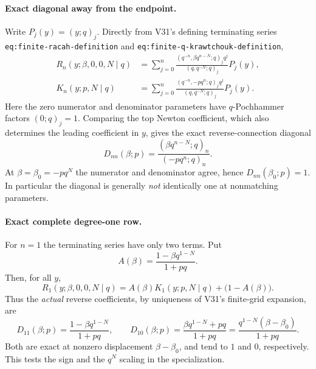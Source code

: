 \documentclass[11pt]{article}
\begin{document}
\paragraph{Exact diagonal away from the endpoint.} Write $P_j(y)=(y;q)_j$. Directly from V31's defining terminating series \texttt{eq:finite-racah-definition} and \texttt{eq:finite-q-krawtchouk-definition},
\begin{align*}
 R_n(y;\beta,0,0,N\mid q)
 &=\sum_{j=0}^n\frac{(q^{-n},\beta q^{n-N};q)_j q^j}{(q,q^{-N};q)_j}P_j(y),\\
 K_n(y;p,N\mid q)
 &=\sum_{j=0}^n\frac{(q^{-n},-pq^n;q)_j q^j}{(q,q^{-N};q)_j}P_j(y).
\end{align*}
Here the zero numerator and denominator parameters have $q$-Pochhammer factors $(0;q)_j=1$. Comparing the top Newton coefficient, which also determines the leading coefficient in $y$, gives the exact reverse-connection diagonal
\begin{equation}\label{eq:v122-diagonal}
 \boxed{D_{nn}(\beta;p)=\frac{(\beta q^{n-N};q)_n}{(-pq^n;q)_n}.}
\end{equation}
At $\beta=\beta_0=-pq^N$ the numerator and denominator agree, hence $D_{nn}(\beta_0;p)=1$. In particular the diagonal is generally \emph{not} identically one at nonmatching parameters.

\paragraph{Exact complete degree-one row.} For $n=1$ the terminating series have only two terms. Put
\[
 A(\beta)=\frac{1-\beta q^{1-N}}{1+pq}.
\]
Then, for all $y$,
\begin{equation}\label{eq:v122-degree-one}
 \boxed{R_1(y;\beta,0,0,N\mid q)=A(\beta)K_1(y;p,N\mid q)+\bigl(1-A(\beta)\bigr).}
\end{equation}
Thus the \emph{actual} reverse coefficients, by uniqueness of V31's finite-grid expansion, are
\begin{equation}\label{eq:v122-row}
 \boxed{D_{11}(\beta;p)=\frac{1-\beta q^{1-N}}{1+pq},\qquad
 D_{10}(\beta;p)=\frac{\beta q^{1-N}+pq}{1+pq}
 =\frac{q^{1-N}(\beta-\beta_0)}{1+pq}.}
\end{equation}
Both are exact at nonzero displacement $\beta-\beta_0$, and tend to $1$ and $0$, respectively. This tests the sign and the $q^N$ scaling in the specialization.
\end{document}
